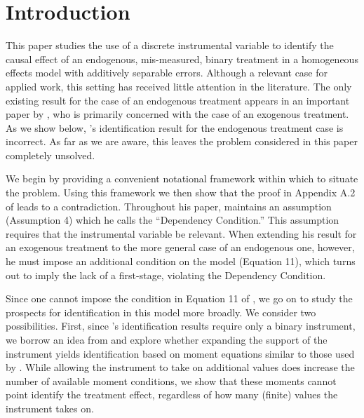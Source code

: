 \section{Introduction}
This paper studies the use of a discrete instrumental variable to identify the causal effect of an endogenous, mis-measured, binary treatment in a homogeneous effects model with additively separable errors.
Although a relevant case for applied work, this setting has received little attention in the literature.
The only existing result for the case of an endogenous treatment appears in an important paper by \cite{Mahajan}, who is primarily concerned with the case of an exogenous treatment.
As we show below, \citeauthor{Mahajan}'s identification result for the endogenous treatment case is incorrect.
As far as we are aware, this leaves the problem considered in this paper completely unsolved.

We begin by providing a convenient notational framework within which to situate the problem.
Using this framework we then show that the proof in Appendix A.2 of \cite{Mahajan} leads to a contradiction.
Throughout his paper, \cite{Mahajan} maintains an assumption (Assumption 4) which he calls the ``Dependency Condition.'' 
This assumption requires that the instrumental variable be relevant.
When extending his result for an exogenous treatment to the more general case of an endogenous one, however, he must impose an additional condition on the model (Equation 11), which turns out to imply the lack of a first-stage, violating the Dependency Condition.

Since one cannot impose the condition in Equation 11 of \cite{Mahajan}, we go on to study the prospects for identification in this model more broadly.
We consider two possibilities.
First, since \citeauthor{Mahajan}'s identification results require only a binary instrument,  we borrow an idea from \cite{Lewbel} and explore whether expanding the support of the instrument yields identification based on moment equations similar to those used by \cite{Mahajan}.
While allowing the instrument to take on additional values does increase the number of available moment conditions, we show that these moments cannot point identify the treatment effect, regardless of how many (finite) values the instrument takes on.

